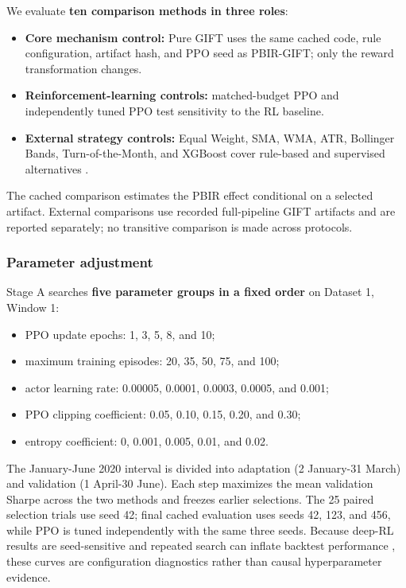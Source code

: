 \documentclass[pdflatex,sn-basic,Numbered]{sn-jnl}
\providecommand{\tightlist}{\setlength{\itemsep}{0pt}\setlength{\parskip}{0pt}}
\begin{document}
We evaluate \textbf{ten comparison methods in three roles}:

\begin{itemize}
\tightlist
\item
  \textbf{Core mechanism control:} Pure GIFT uses the same cached code, rule configuration, artifact hash, and PPO seed as PBIR-GIFT; only the reward transformation changes.
\item
  \textbf{Reinforcement-learning controls:} matched-budget PPO and independently tuned PPO \cite{ref8} test sensitivity to the RL baseline.
\item
  \textbf{External strategy controls:} Equal Weight, SMA, WMA, ATR, Bollinger Bands, Turn-of-the-Month, and XGBoost cover rule-based and supervised alternatives \cite{ref38,ref39,ref40}.
\end{itemize}

The cached comparison estimates the PBIR effect conditional on a selected artifact. External comparisons use recorded full-pipeline GIFT artifacts and are reported separately; no transitive comparison is made across protocols.

\hypertarget{parameter-adjustment}{%
\subsubsection{Parameter adjustment}\label{parameter-adjustment}}

Stage A searches \textbf{five parameter groups in a fixed order} on Dataset 1, Window 1:

\begin{itemize}
\tightlist
\item
  PPO update epochs: 1, 3, 5, 8, and 10;
\item
  maximum training episodes: 20, 35, 50, 75, and 100;
\item
  actor learning rate: 0.00005, 0.0001, 0.0003, 0.0005, and 0.001;
\item
  PPO clipping coefficient: 0.05, 0.10, 0.15, 0.20, and 0.30;
\item
  entropy coefficient: 0, 0.001, 0.005, 0.01, and 0.02.
\end{itemize}

The January-June 2020 interval is divided into adaptation (2 January-31 March) and validation (1 April-30 June). Each step maximizes the mean validation Sharpe across the two methods and freezes earlier selections. The 25 paired selection trials use seed 42; final cached evaluation uses seeds 42, 123, and 456, while PPO is tuned independently with the same three seeds. Because deep-RL results are seed-sensitive \cite{ref32,ref33} and repeated search can inflate backtest performance \cite{ref41,ref42}, these curves are configuration diagnostics rather than causal hyperparameter evidence.
\end{document}
